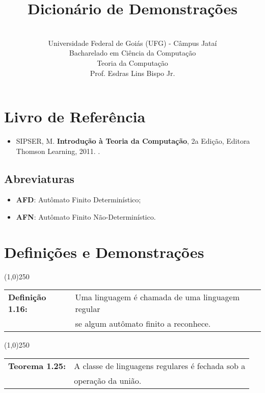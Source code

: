\documentclass[12pt,a4paper,oneside]{article}
\author{\\Universidade Federal de Goiás (UFG) - Câmpus Jataí\\Bacharelado em Ciência da Computação \\Teoria da Computação \\Prof. Esdras Lins Bispo Jr.}
\date{}
\title{\sc \huge Dicionário de Demonstrações}
\begin{document}
\maketitle

\section{Livro de Referência}
	\begin{itemize}
		\item SIPSER, M. {\bf Introdução à Teoria da Computação}, 2a Edição, Editora Thomson Learning, 2011. \color{blue}{\bf Código Bib.: [004 SIP/int]}.
	\end{itemize}
	
	\subsection{Abreviaturas}
		\begin{itemize}
			\item[] {\bf AFD}: Autômato Finito Determinístico;
			\item[] {\bf AFN}: Autômato Finito Não-Determinístico.
		\end{itemize}
	
\section{Definições e Demonstrações}

\begin{center}
\line(1,0){250}
\end{center}

\begin{flushleft}
	\begin{tabular}{ll}
		{\bf Definição 1.16:} & Uma linguagem é chamada de uma linguagem regular \\
							& se algum autômato finito a reconhece.\\
	\end{tabular}
\end{flushleft}

\begin{center}
\line(1,0){250}
\end{center}

\begin{flushleft}
	\begin{tabular}{ll}
		{\bf Teorema 1.25:} & A classe de linguagens regulares é fechada sob a \\
							& operação da união.
	\end{tabular}
\end{flushleft}
\end{document}
